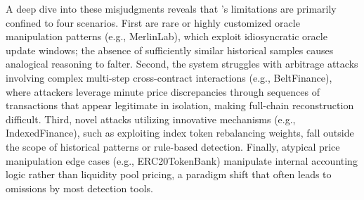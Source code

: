
A deep dive into these misjudgments reveals that \approach{}’s limitations are primarily confined to four scenarios. First are rare or highly customized oracle manipulation patterns (e.g., MerlinLab), which exploit idiosyncratic oracle update windows; the absence of sufficiently similar historical samples causes analogical reasoning to falter. Second, the system struggles with arbitrage attacks involving complex multi-step cross-contract interactions (e.g., BeltFinance), where attackers leverage minute price discrepancies through sequences of transactions that appear legitimate in isolation, making full-chain reconstruction difficult. Third, novel attacks utilizing innovative mechanisms (e.g., IndexedFinance), such as exploiting index token rebalancing weights, fall outside the scope of historical patterns or rule-based detection. Finally, atypical price manipulation edge cases (e.g., ERC20TokenBank) manipulate internal accounting logic rather than liquidity pool pricing, a paradigm shift that often leads to omissions by most detection tools.



\begin{tcolorbox}[colback=black!5!white,colframe=black!75!black,sharp corners,fontupper=\small,title=Answer to RQ1]
\end{tcolorbox}

\subsection{}

